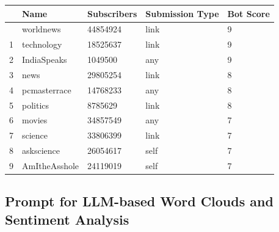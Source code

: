\documentclass[
  12pt,
  letterpaper,
  DIV=11,
  numbers=noendperiod]{scrartcl}
\begin{document}
\begin{longtable}[]{@{}lllll@{}}
\toprule\noalign{}
& Name & Subscribers & Submission Type & Bot Score \\
\midrule\noalign{}
\endhead
\bottomrule\noalign{}
\endlastfoot
0 & worldnews & 44854924 & link & 9 \\
1 & technology & 18525637 & link & 9 \\
2 & IndiaSpeaks & 1049500 & any & 9 \\
3 & news & 29805254 & link & 8 \\
4 & pcmasterrace & 14768233 & any & 8 \\
5 & politics & 8785629 & link & 8 \\
6 & movies & 34857549 & any & 7 \\
7 & science & 33806399 & link & 7 \\
8 & askscience & 26054617 & self & 7 \\
9 & AmItheAsshole & 24119019 & self & 7 \\
\end{longtable}

\subsection*{Prompt for LLM-based Word Clouds and Sentiment
Analysis}\label{prompt-for-llm-based-word-clouds-and-sentiment-analysis}
\end{document}
